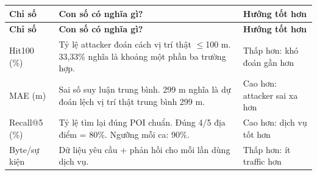 \begingroup\small
\begin{longtable}{@{}P{3.150cm}P{8.959cm}P{4.529cm}@{}}
\toprule
\textbf{Chỉ số} & \textbf{Con số có nghĩa gì?} & \textbf{Hướng tốt hơn}\\\midrule
\endfirsthead
\toprule
\textbf{Chỉ số} & \textbf{Con số có nghĩa gì?} & \textbf{Hướng tốt hơn}\\\midrule
\endhead
\bottomrule\endfoot
Hit100 (\%) & Tỷ lệ attacker đoán cách vị trí thật $\le$100 m. 33,33\% nghĩa là khoảng một phần ba trường hợp. & Thấp hơn: khó đoán gần hơn\\
\addlinespace[3pt]
MAE (m) & Sai số suy luận trung bình. 299 m nghĩa là dự đoán lệch vị trí thật trung bình 299 m. & Cao hơn: attacker sai xa hơn\\
\addlinespace[3pt]
Recall@5 (\%) & Tỷ lệ tìm lại đúng POI chuẩn. Đúng 4/5 địa điểm = 80\%. Ngưỡng mỗi ca: 90\%. & Cao hơn: dịch vụ tốt hơn\\
\addlinespace[3pt]
Byte/sự kiện & Dữ liệu yêu cầu + phản hồi cho mỗi lần dùng dịch vụ. & Thấp hơn: ít traffic hơn\\
\end{longtable}
\endgroup
{}

